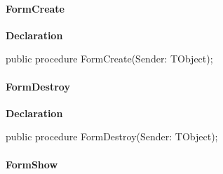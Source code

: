 \documentclass{report}
\newif\ifpdf
\begin{document}
\paragraph*{FormCreate}\hspace*{\fill}

\label{manager.TMnFrm-FormCreate}
\begin{list}{}{
\setlength{\itemindent}{0cm}
\setlength{\listparindent}{0cm}
\setlength{\leftmargin}{\evensidemargin}
\addtolength{\leftmargin}{\tmplength}
\settowidth{\labelsep}{X}
\addtolength{\leftmargin}{\labelsep}
\setlength{\labelwidth}{\tmplength}
}
\item[\textbf{Declaration}\hfill]
\ifpdf
\begin{flushleft}
\fi
\begin{ttfamily}
public procedure FormCreate(Sender: TObject);\end{ttfamily}

\ifpdf
\end{flushleft}
\fi

\end{list}
\paragraph*{FormDestroy}\hspace*{\fill}

\label{manager.TMnFrm-FormDestroy}
\begin{list}{}{
\setlength{\itemindent}{0cm}
\setlength{\listparindent}{0cm}
\setlength{\leftmargin}{\evensidemargin}
\addtolength{\leftmargin}{\tmplength}
\settowidth{\labelsep}{X}
\addtolength{\leftmargin}{\labelsep}
\setlength{\labelwidth}{\tmplength}
}
\item[\textbf{Declaration}\hfill]
\ifpdf
\begin{flushleft}
\fi
\begin{ttfamily}
public procedure FormDestroy(Sender: TObject);\end{ttfamily}

\ifpdf
\end{flushleft}
\fi

\end{list}
\paragraph*{FormShow}\hspace*{\fill}
\end{document}
